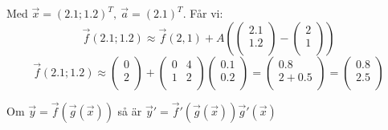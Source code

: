 \documentclass{report}
\begin{document}
{Med $ \vec{x} = (2.1;1.2)^T, \: \vec{a} = (2.1)^T $. Får vi:
\begin{equation*}
\vec{f} (2.1;1.2) \approx \vec{f} (2,1) + A
(
\begin{pmatrix}
	2.1 \\
	1.2 \\
\end{pmatrix}
-
\begin{pmatrix}
	2 \\
	1 \\
\end{pmatrix}
)
\end{equation*}
\begin{equation*}
\vec{f} (2.1;1.2) \approx 
\begin{pmatrix}
	0 \\
	2 \\
\end{pmatrix}
+
\begin{pmatrix}
	0 & 4 \\
	1 & 2 \\
\end{pmatrix}
\begin{pmatrix}
	0.1 \\
	0.2 \\
\end{pmatrix}
=
\begin{pmatrix}
	0.8 \\
	2+0.5 \\
\end{pmatrix}
=
\begin{pmatrix}
	0.8 \\
	2.5 \\
\end{pmatrix}
\end{equation*}
}




{
Om $ \vec{y} = \vec{f} ( \vec{g} ( \vec{x} )) $ så är $ \vec{y}' = \vec{f}'( \vec{g} ( \vec{x} )) \vec{g} '( \vec{x} )  $  
}
\end{document}
